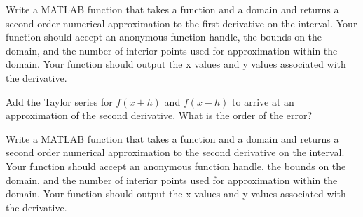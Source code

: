 
\begin{problem}
    Write a MATLAB function that takes a function and a domain and returns a second order
    numerical approximation to the first derivative on the interval.  Your function should
    accept an anonymous function handle, the bounds on the domain, and the number of
    interior points used for approximation within the domain. Your function should output
    the x values and y values associated with the derivative.\\
\end{problem}


\begin{problem}
    Add the Taylor series for $f(x+h)$ and $f(x-h)$ to arrive at an approximation of the
    second derivative. What is the order of the error?  
\end{problem}

\begin{problem}
    Write a MATLAB function that takes a function and a domain and returns a second order
    numerical approximation to the second derivative on the interval.  Your function should
    accept an anonymous function handle, the bounds on the domain, and the number of
    interior points used for approximation within the domain. Your function should output
    the x values and y values associated with the derivative.\\
\end{problem}

